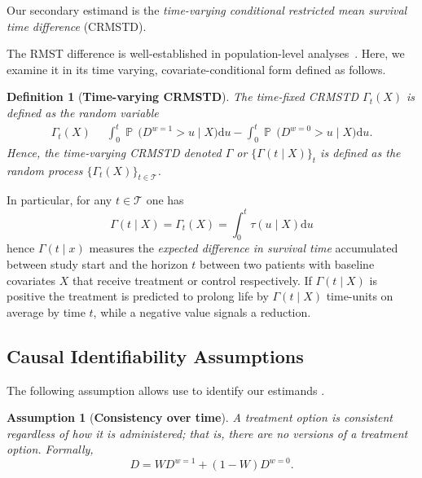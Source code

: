 \documentclass{article}
\newtheorem{definition}{Definition}
\newtheorem{assumption}{Assumption}
\DeclareMathOperator*{\eqdef }{\,\stackrel{\text{def}}{=}\,}
\DeclareMathOperator{\PR}{\mathbb{P}\,}
\newcommand{\nd}{\mathrm{d}}
\begin{document}
Our secondary estimand is the \emph{time-varying conditional restricted mean survival time difference} (CRMSTD).


The RMST difference is well-established in population-level analyses~\citep{royston2013restricted}. Here, we examine it in its time varying, covariate-conditional form defined as follows.
%
\begin{definition}[{\bf Time-varying CRMSTD}]\label{def:time_conditional_RMSTD}
The time-fixed CRMSTD $\Gamma_t(X)$ is defined as the random variable 
\begin{align*}
\Gamma_t (X) &\eqdef \int_0^{t} \PR \bigl(D^{w=1}>u \mid X \bigr) \nd u - \int_0^{t} \PR \bigl(D^{w=0}>u \mid X) \nd u.
\end{align*}
Hence, the time-varying CRMSTD denoted $\Gamma$ or $\{ \Gamma(t \mid X) \}_t$ is defined as the random process $\{ \Gamma_t(X) \}_{t \in \mathcal{T}}$.  
\end{definition}
In particular, for any $t \in \mathcal{T}$ one has
\[ \Gamma(t \mid X) = \Gamma_t(X) = \int_0^{t} \tau(u \mid X)\nd u\]
hence $\Gamma(t\mid x)$ measures the \emph{expected difference in survival time} accumulated between study start and the horizon $t$ between two patients with baseline covariates $X$ that receive treatment or control respectively. If $\Gamma(t \mid X)$ is positive the treatment is predicted to prolong life by $\Gamma(t\mid X)$ time-units on average by time $t$, while a negative value signals a reduction.



\subsection*{Causal Identifiability Assumptions}
The following assumption allows use to identify our estimands \citep{robins2000correcting}.
\begin{assumption}[{\bf Consistency over time}]\label{as:cons_t} A treatment option is consistent regardless of how it is administered; that is, there are no \emph{versions} of a treatment option. Formally, $$D=WD^{w=1}+(1-W)D^{w=0}.$$
\end{assumption}
\end{document}
